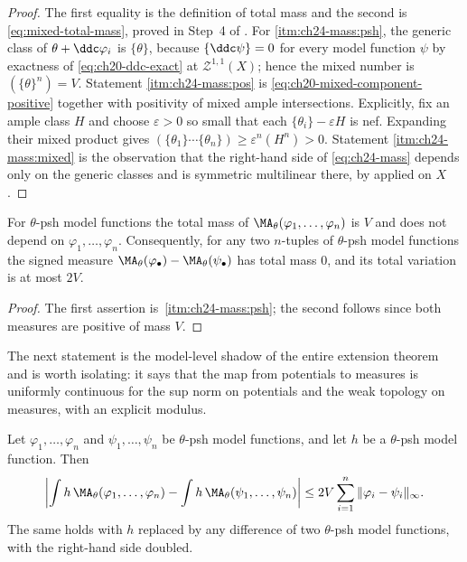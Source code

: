 \begin{proof}
The first equality is the definition of total mass and the second is
\eqref{eq:mixed-total-mass}, proved in Step~4 of
.  For \cref{itm:ch24-mass:psh}, the generic class
of $\theta+\ddc\varphi_i$ is $\{\theta\}$, because
$\{\ddc\psi\}=0$ for every model function $\psi$ by exactness of
\eqref{eq:ch20-ddc-exact} at $\mathcal Z^{1,1}(X)$; hence the mixed number
is $(\{\theta\}^n)=V$.  Statement \cref{itm:ch24-mass:pos} is
\eqref{eq:ch20-mixed-component-positive} together with positivity of
mixed ample intersections.  Explicitly, fix an ample class $H$ and choose
$\varepsilon>0$ so small that each $\{\theta_i\}-\varepsilon H$ is
nef.  Expanding their mixed product gives
$(\{\theta_1\}\cdots\{\theta_n\})\geq\varepsilon^n(H^n)>0$.  Statement \cref{itm:ch24-mass:mixed} is
the observation that the right-hand side of \eqref{eq:ch24-mass} depends only
on the generic classes and is symmetric multilinear there, by
 applied on $X$.
\end{proof}

\begin{corollary}
\label{cor:ch24-mass-independent}
For $\theta$-psh model functions the total mass of
$\MA_\theta(\varphi_1,\ldots,\varphi_n)$ is $V$ and does not depend on
$\varphi_1,\ldots,\varphi_n$.  Consequently, for any two $n$-tuples of
$\theta$-psh model functions the signed measure
$\MA_\theta(\varphi_\bullet)-\MA_\theta(\psi_\bullet)$ has total mass
$0$, and its total variation is at most $2V$.
\end{corollary}

\begin{proof}
The first assertion is
\,\cref{itm:ch24-mass:psh}; the second follows since both
measures are positive of mass $V$.
\end{proof}

The next statement is the model-level shadow of the entire extension theorem
and is worth isolating: it says that the map from potentials to measures is
uniformly continuous for the sup norm on potentials and the weak topology on
measures, with an explicit modulus.

\begin{proposition}
\label{prop:ch24-model-uniform-estimate}
Let $\varphi_1,\ldots,\varphi_n$ and $\psi_1,\ldots,\psi_n$ be
$\theta$-psh model functions, and let $h$ be a $\theta$-psh model
function.  Then
\begin{equation}
\label{eq:ch24-model-uniform-estimate}
 \left|\int h\,\MA_\theta(\varphi_1,\ldots,\varphi_n)
      -\int h\,\MA_\theta(\psi_1,\ldots,\psi_n)\right|
 \leq 2V\sum_{i=1}^{n}\|\varphi_i-\psi_i\|_\infty .
\end{equation}
The same holds with $h$ replaced by any difference of two $\theta$-psh
model functions, with the right-hand side doubled.
\end{proposition}

